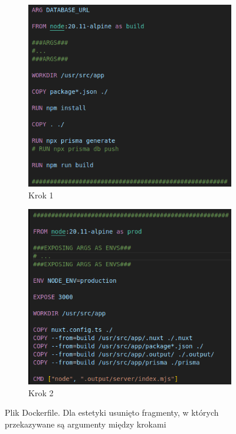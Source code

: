 \begin{figure}[H]

\centering
\begin{subfigure}{0.4\textwidth}
    \centering
    \includegraphics[width=1\linewidth]{zdj/docker_1_cut1.png}
    \caption{Krok 1}
\end{subfigure}
\begin{subfigure}{0.4\textwidth}
    \centering
    \includegraphics[width=1\linewidth]{zdj/docker_1_cut2.png}
    \caption{Krok 2}
\end{subfigure}
\caption{Plik Dockerfile. Dla estetyki usunięto fragmenty, w których przekazywane są argumenty między krokami}

\end{figure}


